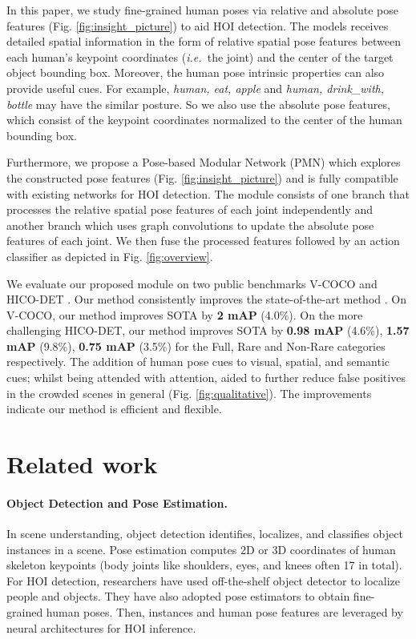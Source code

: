 \documentclass[10pt,twocolumn,letterpaper]{article}
\newcommand{\ie}{{\em i.e.\ }}
\begin{document}
In this paper, we study fine-grained human poses via relative and absolute pose features (Fig. \ref{fig:insight_picture}) to aid HOI detection. The models receives detailed spatial information in the form of relative spatial pose features between each human's keypoint coordinates (\ie the joint) and the center of the target object bounding box. Moreover, the human pose intrinsic properties can also provide useful cues. For example, \textit{human, eat, apple} and \textit{human, drink\_with, bottle} may have the similar posture. So we also use the absolute pose features, which consist of the keypoint coordinates normalized to the center of the human bounding box. 

Furthermore, we propose a Pose-based Modular Network (PMN) which explores the constructed pose features (Fig. \ref{fig:insight_picture}) and is fully compatible with existing networks for HOI detection. The module consists of one branch that processes the relative spatial pose features of each joint independently and another branch which uses graph convolutions to update the absolute pose features of each joint. We then fuse the processed features followed by an action classifier as depicted in Fig. \ref{fig:overview}.

We evaluate our proposed module on two public benchmarks V-COCO \cite{DBLP:GuptaM15} and HICO-DET \cite{chao2018learning}. Our method consistently improves the state-of-the-art method \cite{liang2020visualsemantic}. On V-COCO, our method improves SOTA by \textbf{2 mAP} (4.0\%). On the more challenging HICO-DET, our method improves SOTA by \textbf{0.98 mAP} (4.6\%), \textbf{1.57 mAP} (9.8\%), \textbf{0.75 mAP} (3.5\%) for the Full, Rare and Non-Rare categories respectively. The addition of human pose cues to visual, spatial, and semantic cues; whilst being attended with attention, aided to further reduce false positives in the crowded scenes in general (Fig. \ref{fig:qualitative}). The improvements indicate our method is efficient and flexible.

\section{Related work}\label{sec:relatedWorks}


\paragraph{\textbf{Object Detection and Pose Estimation.}}
In scene understanding, object detection \cite{renNIPS15fasterrcnn,liu2016ssd,dai2016r,girshick2015fast} identifies, localizes, and classifies object instances in a scene.
Pose estimation \cite{Dabral2018LearningMotion,pavllo20193d,liu2020gastnet} 
computes 2D or 3D coordinates of human skeleton keypoints (body joints like shoulders, eyes, and knees often 17 in total). For HOI detection, researchers have used off-the-shelf object detector to localize people and objects. They have also adopted pose estimators to obtain fine-grained human poses. Then, instances and human pose features are leveraged by neural architectures for HOI inference.
\end{document}
